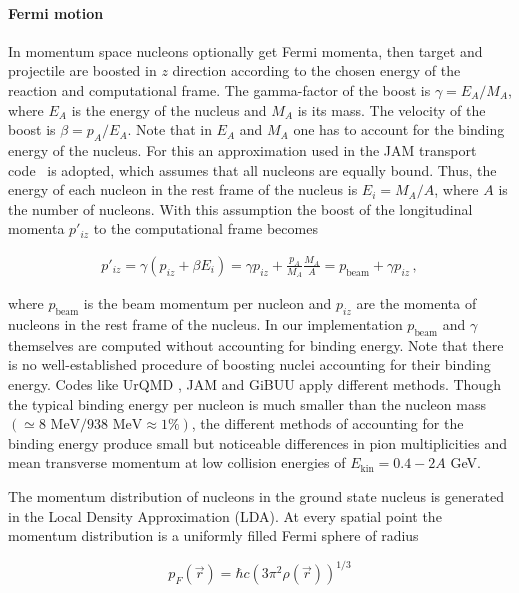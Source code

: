 \paragraph{Fermi motion}

In momentum space nucleons optionally get Fermi momenta, then target and
projectile are boosted in $z$ direction according to the chosen energy of the
reaction and computational frame. The gamma-factor of the boost is $\gamma =
E_A/M_A$, where $E_A$ is the energy of the nucleus and $M_A$ is its mass. The
velocity of the boost is $\beta = p_A/E_A$. Note that in $E_A$ and $M_A$ one
has to account for the binding energy of the nucleus. For this an approximation used
in the JAM transport code~\cite{Nara:1999dz} is adopted, which assumes
that all nucleons are equally bound. Thus, the energy of each nucleon in the
rest frame of the nucleus is $E_i = M_A/A$, where $A$ is the number of
nucleons. With this assumption the boost of the longitudinal momenta $p'_{iz}$
to the computational frame becomes

\begin{align}
  p'_{iz} = \gamma (p_{iz} + \beta E_i) = \gamma p_{iz} + \frac{p_A}{M_A} \frac{M_A}{A} = p_\text{beam} + \gamma p_{iz} \,,
\end{align}

where $p_\text{beam}$ is the beam momentum per nucleon and $p_{iz}$ are the
momenta of nucleons in the rest frame of the nucleus. In our implementation
$p_\text{beam}$ and $\gamma$ themselves are computed without accounting for
binding energy. Note that there is no well-established procedure of boosting
nuclei accounting for their binding energy. Codes like UrQMD
\cite{Bass:1998ca}, JAM \cite{Nara:1999dz} and GiBUU \cite{Buss:2011mx}
apply different methods. Though the typical binding energy per nucleon is much
smaller than the nucleon mass $(\simeq 8 \text{ MeV}/938 \text{ MeV} \approx
1\%)$, the different methods of accounting for the binding energy
produce small but noticeable differences in pion multiplicities and mean
transverse momentum at low collision energies of $E_\text{kin} = 0.4-2A$ GeV.

The momentum distribution of nucleons in the ground state nucleus is generated
in the Local Density Approximation (LDA). At every spatial point the momentum
distribution is a uniformly filled Fermi sphere of radius

\begin{equation}
p_F (\vec{r}) = \hbar c (3 \pi^2 \rho (\vec{r}))^{1/3}
\end{equation}

